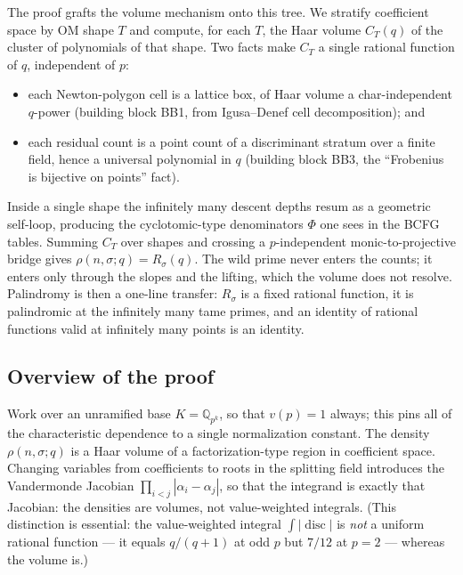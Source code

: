 \documentclass[pdflatex,sn-mathphys-num]{sn-jnl}%
\DeclareMathOperator{\disc}{disc}
\newcommand{\bbQ}{\mathbb{Q}}
\theoremstyle{plain}
\theoremstyle{definition}
\theoremstyle{remark}
\numberwithin{equation}{section}
\begin{document}
The proof grafts the volume mechanism onto this tree. We stratify coefficient space
by OM shape $T$ and compute, for each $T$, the Haar volume $C_{T}(q)$ of the
cluster of polynomials of that shape. Two facts make $C_{T}$ a single rational
function of $q$, independent of $p$:
\begin{itemize}[leftmargin=1.6em]
\item each Newton-polygon cell is a lattice box, of Haar volume a char-independent
$q$-power (building block \textsc{BB1}, from Igusa--Denef cell decomposition); and
\item each residual count is a point count of a discriminant stratum over a finite
field, hence a universal polynomial in $q$ (building block \textsc{BB3}, the
``Frobenius is bijective on points'' fact).
\end{itemize}
Inside a single shape the infinitely many descent depths resum as a geometric
self-loop, producing the cyclotomic-type denominators $\Phi$ one sees in the BCFG
tables. Summing $C_{T}$ over shapes and crossing a $p$-independent
monic-to-projective bridge gives $\rho(n,\sigma;q)=R_{\sigma}(q)$. The wild prime
never enters the counts; it enters only through the slopes and the lifting, which
the volume does not resolve. Palindromy is then a one-line transfer: $R_{\sigma}$ is
a fixed rational function, it is palindromic at the infinitely many tame primes,
and an identity of rational functions valid at infinitely many points is an
identity.

\subsection{Overview of the proof}\label{sec:overview}

Work over an unramified base $K=\bbQ_{p^{k}}$, so that $v(p)=1$ always; this pins
all of the characteristic dependence to a single normalization constant. The
density $\rho(n,\sigma;q)$ is a Haar volume of a factorization-type region in
coefficient space. Changing variables from coefficients to roots in the splitting
field introduces the Vandermonde Jacobian $\prod_{i<j}|\alpha_{i}-\alpha_{j}|$, so
that the integrand is exactly that Jacobian: the densities are volumes, not
value-weighted integrals. (This distinction is essential: the value-weighted
integral $\int|\disc|$ is \emph{not} a uniform rational function --- it equals
$q/(q+1)$ at odd $p$ but $7/12$ at $p=2$ --- whereas the volume is.)
\end{document}
